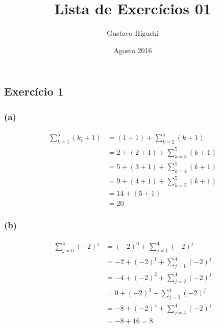 \documentclass{article}
\title{Lista de Exercícios 01}
\author{Gustavo Higuchi}
\date{Agosto 2016}
\begin{document}
\maketitle

\tableofcontents
\newpage


\chapter{}
\section{Exercício 1}
\subsection*{(a)}

\begin{equation} \label{eq1}
\begin{split}
\sum\limits_{k=1}^{5}(k_i + 1) & =  (1 + 1) + \sum\limits_{k=2}^{5}(k + 1) \\
& =  2 + (2 + 1) + \sum\limits_{k=3}^{5}(k + 1) \\
& =  5 + (3 + 1) + \sum\limits_{k=4}^{5}(k + 1) \\
& =  9 + (4 + 1) + \sum\limits_{k=5}^{5}(k + 1) \\
& =  14 + (5 + 1)  \\
& =  20  
\end{split}
\end{equation}

\subsection*{(b)}
\begin{equation} \label{eq2}
\begin{split}
\sum\limits_{j=0}^{4}(-2)^j & =  (-2)^0 + \sum\limits_{j=1}^{4}(-2)^j \\
& =  -2 + (-2)^1 + \sum\limits_{j=1}^{4}(-2)^j \\
& =  -4 + (-2)^2 + \sum\limits_{j=2}^{4}(-2)^j \\
& =  0 + (-2)^3 + \sum\limits_{j=3}^{4}(-2)^j \\
& =  -8 + (-2)^4 + \sum\limits_{j=4}^{4}(-2)^j \\
& = -8 + 16 = 8
\end{split}
\end{equation}
\end{document}
